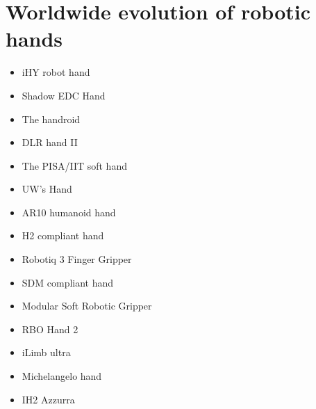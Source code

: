 \documentclass[a4paper, 10pt, conference]{ieeeconf}      %
\begin{document}
\section{\textbf{Worldwide evolution of robotic hands}}
\begin{itemize}
\item iHY robot hand
\item Shadow EDC Hand
\item The handroid
\item DLR hand II
\item The PISA/IIT soft hand
\item UW’s Hand
\item AR10 humanoid hand
\item H2 compliant hand
\item Robotiq 3 Finger Gripper
\item SDM compliant hand
\item Modular Soft Robotic Gripper
\item RBO Hand 2
\item iLimb ultra
\item Michelangelo hand
\item IH2 Azzurra
\end{itemize}
\end{document}
